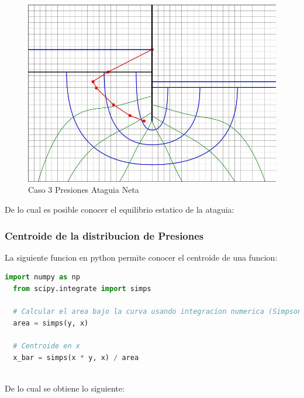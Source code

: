 \documentclass{article}
\begin{document}
\begin{figure}[H]
\begin{minipage}{0.32\textwidth}
      \includegraphics[width=\textwidth]{FOTOS/caso_3_presion_ataquia_neta.jpg}
      \caption{Caso 3 Presiones Ataguia Neta}
  \end{minipage}
\end{figure}

De lo cual es posible conocer el equilibrio estatico de la ataguia:

\subsubsection{Centroide de la distribucion de Presiones}

La siguiente funcion en python permite conocer el centroide de una funcion:

\begin{lstlisting}[language=Python]
  import numpy as np
  from scipy.integrate import simps

  # Calcular el area bajo la curva usando integracion numerica (Simpson)
  area = simps(y, x)

  # Centroide en x
  x_bar = simps(x * y, x) / area
  
\end{lstlisting}

De lo cual se obtiene lo siguiente:
\end{document}
